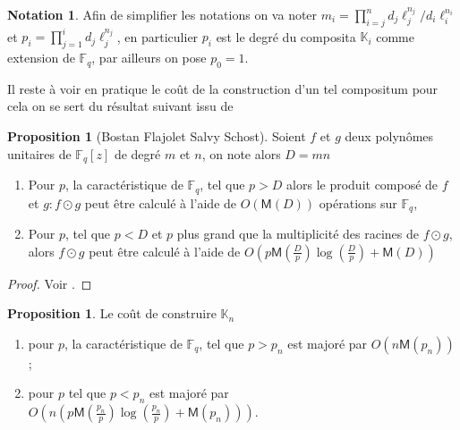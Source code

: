 \documentclass[10pt,a4paper]{book}
\theoremstyle{plain}
\theoremstyle{definition}
\theoremstyle{definition}
\theoremstyle{definition}
\newtheorem{prop}[thm]{Proposition}
\theoremstyle{definition}
\theoremstyle{remark}
\theoremstyle{remark}
\theoremstyle{definition}
\newtheorem{nota}[thm]{Notation}
\begin{document}
\begin{nota} Afin de simplifier les notations on va 
 noter $m_i=\prod_{i=j}^nd_j\ell_j^{n_j}/d_i\ell_i^{n_i}$ et 
 $p_{i}=\prod_{j=1}^{i}d_j\ell_j^{n_j}$, en particulier $p_{i}$ est le 
 degré du composita $\mathbb{K}_i$ comme extension de $\mathbb{F}_q$, par 
 ailleurs on pose $p_0=1$.
\end{nota}

Il reste à voir en pratique le coût de la construction d'un tel compositum pour 
cela on se sert du résultat suivant issu de \cite[Theorem 1]{BostanFlajoletSalvySchost06}

\begin{prop}[Bostan Flajolet Salvy Schost]
\label{pro:comp:prod}
Soient $f$ et $g$ deux polynômes unitaires de $\mathbb{F}_q[z]$ de degré $m$ et $n$, on note alors $D=mn$
\begin{enumerate}
\item Pour $p$, la caractéristique de $\mathbb{F}_q$, tel que $p>D$ alors le produit composé de $f$ et $g: f \odot g$ peut être calculé à l'aide de  $O(\mathsf{M}(D))$ opérations sur $\mathbb{F}_q$,
\item Pour $p$, tel que $p<D$ et $p$ plus grand que la multiplicité des racines de $f \odot g$, alors $f \odot g$ peut être calculé à l'aide de $O(p\mathsf{M}(\frac{D}{p})\log(\frac{D}{p})+\mathsf{M}(D))$
\end{enumerate}
\end{prop}

\begin{proof}
Voir \cite{BostanFlajoletSalvySchost06}.
\end{proof}

\begin{prop}
\label{pro:con:comp}
Le coût de construire $\mathbb{K}_n$
\begin{enumerate}
\item pour $p$, la caractéristique de $\mathbb{F}_q$, tel que $p>p_n$
est majoré par $O(n\mathsf{M}(p_n))$;
\item pour $p$ tel que $p<p_n$ est majoré par 
$O(n(p\mathsf{M}(\frac{p_n}{p})\log(\frac{p_n}{p})+\mathsf{M}(p_n)))$.
\end{enumerate}
\end{prop}
\end{document}
